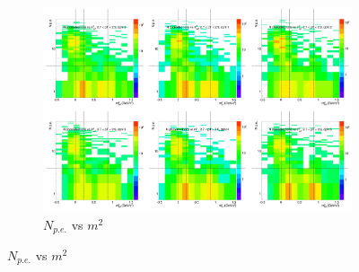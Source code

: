 \begin{figure}[H]
  \centering
    \begin{subfigure}{1\textwidth}
    \includegraphics[width=1\textwidth]{hiptfits/neg/PSaccthreshold_cent0_ich0_accfire0_ptbin11.jpg}
    \caption{$N_{p.e.}$ vs $m^2$}
    \end{subfigure}
\end{figure}
